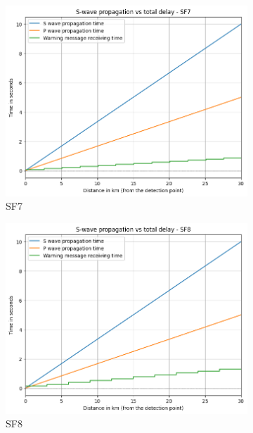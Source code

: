 \begin{figure}[htp!]
    \centering
    \begin{subfigure}{0.45\linewidth}
        \includegraphics[width=\linewidth]{images/sf_7_30km.png}
        \caption{SF7}
    \end{subfigure}
    \hfill
    \begin{subfigure}{0.45\linewidth}
        \includegraphics[width=\linewidth]{images/sf-08-30km.png}
        \caption{SF8}
    \end{subfigure}
    \\
    \begin{subfigure}{0.45\linewidth}

\end{subfigure}
\end{figure}
